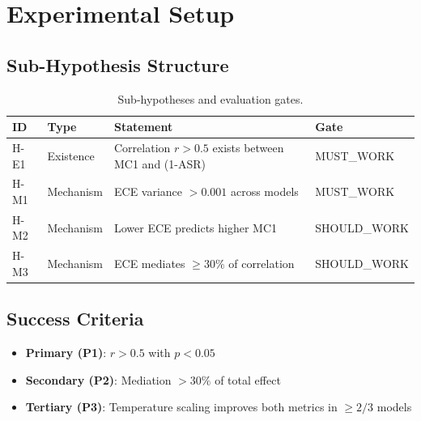 \section{Experimental Setup}

\subsection{Sub-Hypothesis Structure}

\begin{table}[t]
\centering
\caption{Sub-hypotheses and evaluation gates.}
\label{tab:hypotheses}
\begin{tabular}{@{}llll@{}}
\toprule
ID & Type & Statement & Gate \\
\midrule
H-E1 & Existence & Correlation $r > 0.5$ exists between MC1 and (1-ASR) & MUST\_WORK \\
H-M1 & Mechanism & ECE variance $> 0.001$ across models & MUST\_WORK \\
H-M2 & Mechanism & Lower ECE predicts higher MC1 & SHOULD\_WORK \\
H-M3 & Mechanism & ECE mediates $\geq 30\%$ of correlation & SHOULD\_WORK \\
\bottomrule
\end{tabular}
\end{table}

\subsection{Success Criteria}

\begin{itemize}
    \item \textbf{Primary (P1)}: $r > 0.5$ with $p < 0.05$
    \item \textbf{Secondary (P2)}: Mediation $> 30\%$ of total effect
    \item \textbf{Tertiary (P3)}: Temperature scaling improves both metrics in $\geq 2/3$ models
\end{itemize}
